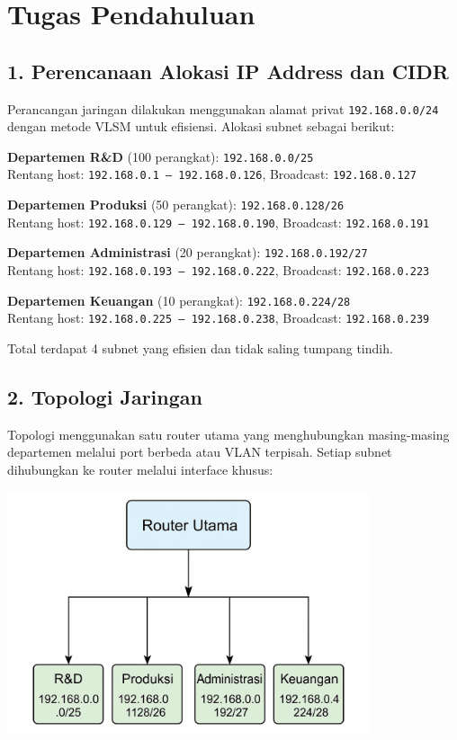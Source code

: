 \section{Tugas Pendahuluan}
	\subsection*{1. Perencanaan Alokasi IP Address dan CIDR}
Perancangan jaringan dilakukan menggunakan alamat privat \texttt{192.168.0.0/24} dengan metode VLSM untuk efisiensi. Alokasi subnet sebagai berikut:

    \textbf{Departemen R\&D} (100 perangkat): \texttt{192.168.0.0/25} \\
    Rentang host: \texttt{192.168.0.1 – 192.168.0.126}, Broadcast: \texttt{192.168.0.127}

    \textbf{Departemen Produksi} (50 perangkat): \texttt{192.168.0.128/26} \\
    Rentang host: \texttt{192.168.0.129 – 192.168.0.190}, Broadcast: \texttt{192.168.0.191}

    \textbf{Departemen Administrasi} (20 perangkat): \texttt{192.168.0.192/27} \\
    Rentang host: \texttt{192.168.0.193 – 192.168.0.222}, Broadcast: \texttt{192.168.0.223}
    
    \textbf{Departemen Keuangan} (10 perangkat): \texttt{192.168.0.224/28} \\
    Rentang host: \texttt{192.168.0.225 – 192.168.0.238}, Broadcast: \texttt{192.168.0.239}

Total terdapat 4 subnet yang efisien dan tidak saling tumpang tindih.

	\subsection*{2. Topologi Jaringan}

Topologi menggunakan satu router utama yang menghubungkan masing-masing departemen melalui port berbeda atau VLAN terpisah. Setiap subnet dihubungkan ke router melalui interface khusus:

\begin{center}
\includegraphics[width=0.8\textwidth]{P1/img/topologi.png}
\end{center}

